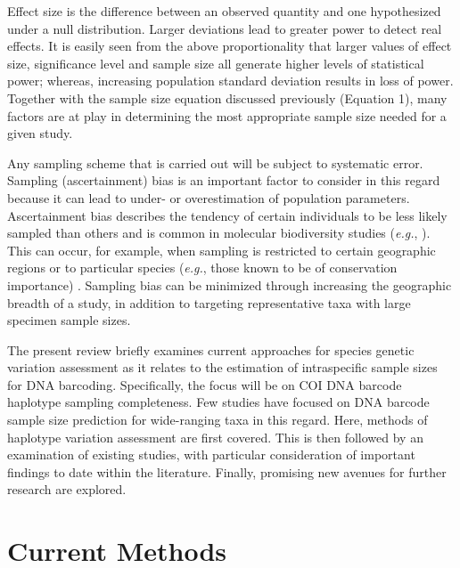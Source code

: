 \noindent Effect size is the difference between an observed quantity and one hypothesized under a null distribution. Larger deviations lead to greater power to detect real effects. It is easily seen from the above proportionality that larger values of effect size, significance level and sample size all generate higher levels of statistical power; whereas, increasing population standard deviation results in loss of power. Together with the sample size equation discussed previously (Equation 1), many factors are at play in determining the most appropriate sample size needed for a given study.

\vspace{5mm}

Any sampling scheme that is carried out will be subject to systematic error. Sampling (ascertainment) bias is an important factor to consider in this regard because it can lead to under- or overestimation of population parameters. Ascertainment bias describes the tendency of certain individuals to be less likely sampled than others \cite{parr2012evolutionary} and is common in molecular biodiversity studies (\textit{e.g.}, \cite{hanner2011fish, muirhead2008identifying, mutanen2016species, wilkinson2017replacing}). This can occur, for example, when sampling is restricted to certain geographic regions \cite{muirhead2008identifying} or to particular species (\textit{e.g.}, those known to be of conservation importance) \cite{hanner2011fish}. Sampling bias can be minimized through increasing the geographic breadth of a study, in addition to targeting representative taxa with large specimen sample sizes.

\vspace{5mm}

The present review briefly examines current approaches for species genetic variation assessment as it relates to the estimation of intraspecific sample sizes for DNA barcoding. Specifically, the focus will be on COI DNA barcode haplotype sampling completeness. Few studies have focused on DNA barcode sample size prediction for wide-ranging taxa in this regard. Here, methods of haplotype variation assessment are first covered. This is then followed by an examination of existing studies, with particular consideration of important findings to date within the literature. Finally, promising new avenues for further research are explored.

\vspace{5mm}

\section{Current Methods}

